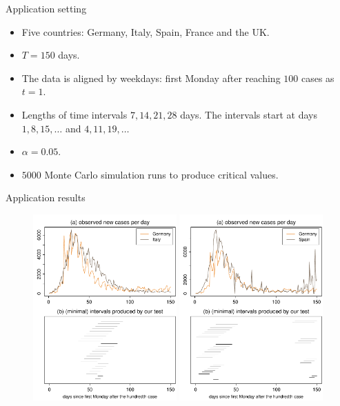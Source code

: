 \documentclass[10pt]{beamer}
\begin{document}
\begin{frame}{Application setting}
\begin{itemize}
\item Five countries: Germany, Italy, Spain, France and the UK.
\item $T = 150$ days. 
\item The data is aligned by weekdays: first Monday after reaching $100$ cases as $t=1$.
\item Lengths of time intervals $7, 14, 21, 28$ days. The intervals start at days $1, 8, 15, \ldots$ and $4, 11, 19, \ldots$
\item $\alpha = 0.05$.
\item $5000$ Monte Carlo simulation runs to produce critical values.
\end{itemize}
\end{frame}

\begin{frame}{Application results}
	\begin{figure}
		\includegraphics[width=0.49\textwidth]{plots/DEU_vs_ITA_presentation}
		\hfill
		\includegraphics[width=0.49\textwidth]{plots/DEU_vs_ESP_presentation}
	\end{figure}
\end{frame}
\end{document}
